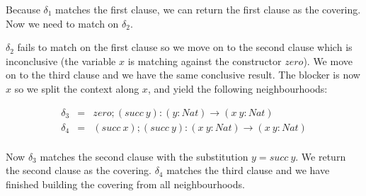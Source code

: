Because $\delta_1$ matches the first clause, we can return the first clause as the covering. Now we need to match on $\delta_2$.

$\delta_2$ fails to match on the first clause so we move on to the second clause which is inconclusive (the variable $x$ is matching against the constructor $zero$). We move on to the third clause and we have the same conclusive result. The blocker is now $x$ so we split the context along $x$, and yield the following neighbourhoods:

\begin{figure}[H]
  \begin{equation*}
    \begin{aligned}
      \delta_3 & = & zero; (succ \ y) : (y : Nat) \to (x \ y : Nat) \\
      \delta_4 & = & (succ \ x); (succ \ y) : (x \ y : Nat) \to (x \ y : Nat) \\
    \end{aligned}
  \end{equation*}
\end{figure}

Now $\delta_3$ matches the second clause with the substitution $y = succ \ y$. We return the second clause as the covering. $\delta_4$ matches the third clause and we have finished building the covering from all neighbourhoods.
